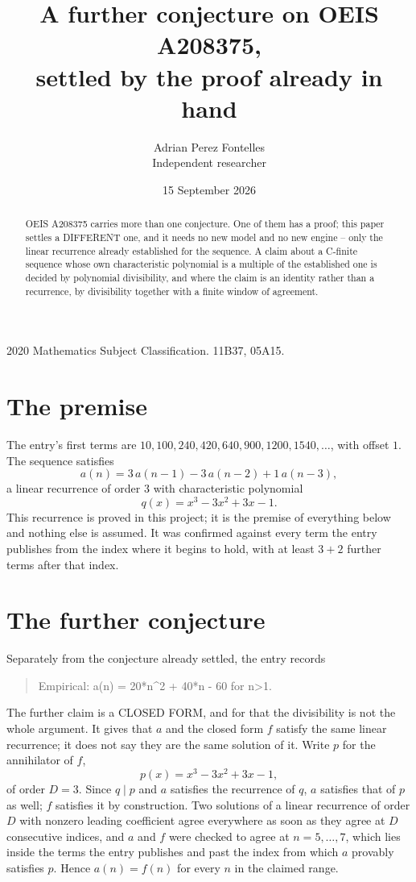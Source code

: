 \documentclass[11pt,a4paper]{article}
\title{A further conjecture on OEIS A208375,\\ \large settled by the proof already in hand}
\author{Adrian Perez Fontelles\\ \small Independent researcher}
\date{15 September 2026}
\theoremstyle{plain}
\theoremstyle{definition}
\begin{document}
\maketitle

\begin{abstract}
OEIS A208375 carries more than one conjecture. One of them has a proof; this paper settles a
DIFFERENT one, and it needs no new model and no new engine -- only the linear recurrence already
established for the sequence. A claim about a C-finite sequence whose own characteristic
polynomial is a multiple of the established one is decided by polynomial divisibility, and where
the claim is an identity rather than a recurrence, by divisibility together with a finite window
of agreement.
\end{abstract}

\noindent\small 2020 Mathematics Subject Classification. 11B37, 05A15.\normalsize

\section{The premise}

The entry's first terms are $10, 100, 240, 420, 640, 900, 1200, 1540,\dots$, with offset $1$. The sequence satisfies
\[
  a(n)=3\,a(n-1) - 3\,a(n-2) + 1\,a(n-3) ,
\]
a linear recurrence of order $3$ with characteristic polynomial
\[
  q(x)=x^{3} - 3 x^{2} + 3 x - 1 .
\]
This recurrence is proved in this project; it is the premise of everything below and nothing else is assumed.
It was confirmed against every term the entry publishes from the index where it begins to hold,
with at least $3+2$ further terms after that index.

\section{The further conjecture}

Separately from the conjecture already settled, the entry records

\begin{quote}\raggedright Empirical: a(n) = 20*n\^{}2 + 40*n - 60 for n>1.\end{quote}

The further claim is a CLOSED FORM, and for that the divisibility is not the whole argument. It
gives that $a$ and the closed form $f$ satisfy the same linear recurrence; it does not say they
are the same solution of it. Write $p$ for the annihilator of $f$,
\[
  p(x)=x^{3} - 3 x^{2} + 3 x - 1 ,
\]
of order $D=3$. Since $q\mid p$ and $a$ satisfies the recurrence of $q$, $a$ satisfies that of
$p$ as well; $f$ satisfies it by construction. Two solutions of a linear recurrence of order $D$
with nonzero leading coefficient agree everywhere as soon as they agree at $D$ consecutive
indices, and $a$ and $f$ were checked to agree at $n=5,\dots,7$,
which lies inside the terms the entry publishes and past the index from which $a$ provably
satisfies $p$. Hence $a(n)=f(n)$ for every $n$ in the claimed range.
\end{document}

